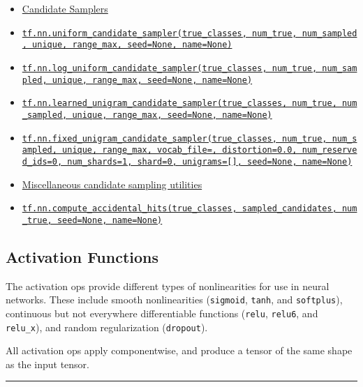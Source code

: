 \begin{itemize}
\item
  \protect\hyperlink{AUTOGENERATED-candidate-samplers}{Candidate
  Samplers}
\item
  \protect\hyperlink{uniformux5fcandidateux5fsampler}{\texttt{tf.nn.uniform\_candidate\_sampler(true\_classes,\ num\_true,\ num\_sampled,\ unique,\ range\_max,\ seed=None,\ name=None)}}
\item
  \protect\hyperlink{logux5funiformux5fcandidateux5fsampler}{\texttt{tf.nn.log\_uniform\_candidate\_sampler(true\_classes,\ num\_true,\ num\_sampled,\ unique,\ range\_max,\ seed=None,\ name=None)}}
\item
  \protect\hyperlink{learnedux5funigramux5fcandidateux5fsampler}{\texttt{tf.nn.learned\_unigram\_candidate\_sampler(true\_classes,\ num\_true,\ num\_sampled,\ unique,\ range\_max,\ seed=None,\ name=None)}}
\item
  \protect\hyperlink{fixedux5funigramux5fcandidateux5fsampler}{\texttt{tf.nn.fixed\_unigram\_candidate\_sampler(true\_classes,\ num\_true,\ num\_sampled,\ unique,\ range\_max,\ vocab\_file=\textquotesingle{}\textquotesingle{},\ distortion=0.0,\ num\_reserved\_ids=0,\ num\_shards=1,\ shard=0,\ unigrams={[}{]},\ seed=None,\ name=None)}}
\item
  \protect\hyperlink{AUTOGENERATED-miscellaneous-candidate-sampling-utilities}{Miscellaneous
  candidate sampling utilities}
\item
  \protect\hyperlink{computeux5faccidentalux5fhits}{\texttt{tf.nn.compute\_accidental\_hits(true\_classes,\ sampled\_candidates,\ num\_true,\ seed=None,\ name=None)}}
\end{itemize}

\subsection{Activation Functions }\label{activation-functions}

The activation ops provide different types of nonlinearities for use in
neural networks. These include smooth nonlinearities (\texttt{sigmoid},
\texttt{tanh}, and \texttt{softplus}), continuous but not everywhere
differentiable functions (\texttt{relu}, \texttt{relu6}, and
\texttt{relu\_x}), and random regularization (\texttt{dropout}).

All activation ops apply componentwise, and produce a tensor of the same
shape as the input tensor.

\begin{center}\rule{0.5\linewidth}{\linethickness}\end{center}


